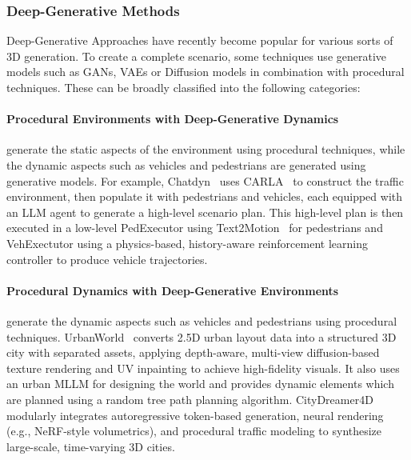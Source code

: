 \documentclass{article}
\begin{document}
\subsubsection{Deep-Generative Methods}

Deep-Generative Approaches have recently become popular for various sorts of 3D generation. To create a complete scenario, some techniques use generative models such as GANs, VAEs or Diffusion models in combination with procedural techniques. These can be broadly classified into the following categories:

\paragraph{Procedural Environments with Deep-Generative Dynamics} generate the static aspects of the environment using procedural techniques, while the dynamic aspects such as vehicles and pedestrians are generated using generative models. For example, Chatdyn~\cite{wei2024chatdyn} uses CARLA~\cite{dosovitskiy2017carla} to construct the traffic environment, then populate it with pedestrians and vehicles, each equipped with an LLM agent to generate a high-level scenario plan. This high-level plan is then executed in a low-level PedExecutor using Text2Motion~\cite{guo2024momask} for pedestrians and VehExectutor using a physics-based, history-aware reinforcement learning controller to produce vehicle trajectories.

\paragraph{Procedural Dynamics with Deep-Generative Environments} generate the dynamic aspects such as vehicles and pedestrians using procedural techniques. UrbanWorld~\cite{shang2024urbanworld} converts 2.5D urban layout data into a structured 3D city with separated assets, applying depth-aware, multi-view diffusion-based texture rendering and UV inpainting to achieve high-fidelity visuals. It also uses an urban MLLM for designing the world and provides dynamic elements which are planned using a random tree path planning algorithm. CityDreamer4D~\cite{xie2024citydreamer} modularly integrates autoregressive token-based generation, neural rendering (e.g., NeRF-style volumetrics), and procedural traffic modeling to synthesize large-scale, time-varying 3D cities.
\end{document}
